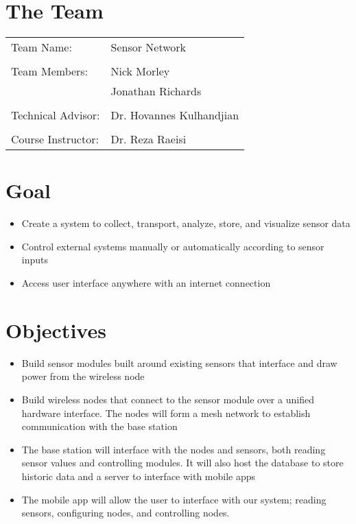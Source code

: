 


  	
	\section{The Team}
		\begin{tabular}{l l}
			Team Name:    & Sensor Network    \\
			\\
			Team Members: & Nick Morley       \\
			              & Jonathan Richards \\
			              \\
			Technical Advisor: & Dr. Hovannes Kulhandjian\\
			\\
			Course Instructor: & Dr. Reza Raeisi\\
		\end{tabular}
		 
	\section{Goal}
		\begin{itemize}
			\item Create a system to collect, transport, analyze, store, and visualize sensor data
			\item Control external systems manually or automatically according to sensor inputs
			\item Access user interface anywhere with an internet connection
		\end{itemize}
		
	\section{Objectives}
		\begin{itemize}
			\item Build sensor modules built around existing sensors that interface and draw power from the wireless node
			\item Build wireless nodes that connect to the sensor module over a unified hardware interface. The nodes will form a mesh network to establish communication with the base station
			\item The base station will interface with the nodes and sensors, both reading sensor values and controlling modules. It will also host the database to store historic data and a server to interface with mobile apps
			\item The mobile app will allow the user to interface with our system; reading sensors, configuring nodes, and controlling nodes.
		\end{itemize}
	
